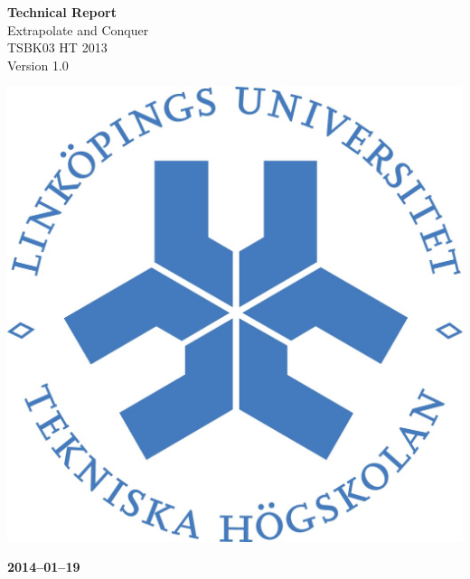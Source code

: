 \documentclass[pdftex, fontsize=11pt, a4paper]{scrbook}
\begin{document}
\begin{titlepage}
\thispagestyle{empty}
\begin{center}
	\vspace*{4\baselineskip}

	\textbf{\huge Technical Report} \\
	\vspace*{0.5\baselineskip}
	{\large  Extrapolate and Conquer} \\
	\vspace*{0.5\baselineskip}
	{\large  TSBK03 HT 2013} \\
	\vspace*{0.5\baselineskip}
	{\large  Version 1.0}


	\vspace*{6\baselineskip}
	\includegraphics[width=0.4\linewidth]{lith_sigill_col}

	\vfill

	\textbf{2014--01--19} \\
	[2\baselineskip]
\end{center}

\end{titlepage}
\end{document}
